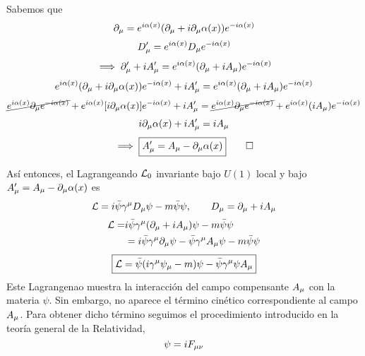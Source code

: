 \begin{prueba}
	Sabemos que
	\begin{equation}
  \partial_\mu =e^{i\alpha(x)}(\partial_\mu +i\partial_\mu \alpha(x))e^{-i\alpha(x)}
\end{equation}
\begin{equation}
  D_\mu '=e^{i\alpha(x)}D_\mu e^{-i\alpha(x)}
\end{equation}
\begin{equation}
  \implies \partial_\mu '+iA_\mu '=e^{i\alpha(x)}(\partial_\mu +iA_\mu )e^{-i\alpha(x)}
\end{equation}
\begin{equation}
  e^{i\alpha(x)}(\partial_\mu +i\partial_\mu \alpha(x))e^{-i\alpha(x)}+iA_\mu '=e^{i\alpha(x)}(\partial_\mu +iA_\mu )e^{-i\alpha(x)}
\end{equation}
\begin{equation}
  \cancel{e^{i\alpha(x)}\partial_\mu e^{-i\alpha(x)}}+e^{i\alpha(x)}[i\partial_\mu \alpha(x)]e^{-i\alpha(x)}+iA_\mu '=\cancel{e^{i\alpha(x)}\partial_\mu e^{-i\alpha(x)}}+e^{i\alpha(x)}(iA_\mu )e^{-i\alpha(x)}
\end{equation}
\begin{equation}
  i\partial_\mu \alpha(x)+iA_\mu '=iA_\mu 
\end{equation}
\begin{equation}
  \implies \boxed{A_\mu '=A_\mu -\partial_\mu \alpha(x)}\qquad \Box 
\end{equation}
\end{prueba}
Así entonces, el Lagrangeando $\mathcal{L}_0$ invariante bajo $U(1)$ local y bajo $A_\mu '=A_\mu -\partial_\mu \alpha(x)$ es
\begin{equation}
  \mathcal{L} =i\bar{\psi}\gamma^\mu D_\mu \psi-m\bar{\psi}\psi,\qquad D_\mu =\partial_\mu +iA_\mu 
\end{equation}
\begin{align}
  \mathcal{L} =&i\bar{\psi}\gamma ^\mu (\partial_\mu +iA_\mu )\psi-m\bar{\psi}\psi\\
  &=i\bar{\psi}\gamma^\mu \partial_\mu \psi-\bar{\psi}\gamma^\mu A_\mu \psi-m\bar{\psi}\psi
\end{align}
\begin{equation}
\boxed{  \mathcal{L} =\bar{\psi}(i\gamma^\mu \psi_\mu -m)\psi-\bar{\psi}\gamma^\mu \psi A_\mu }
\end{equation}
Este Lagrangenao muestra la interacción del campo compensante $A_\mu $ con la materia $\psi$. Sin embargo, no aparece el término cinético correspondiente al campo $A_\mu $. Para obtener dicho término seguimos el procedimiento introducido en la teoría general de la Relatividad,
\begin{equation}
  [D_\m ,D_\n ]\psi=iF_{\m\n }
\end{equation}
